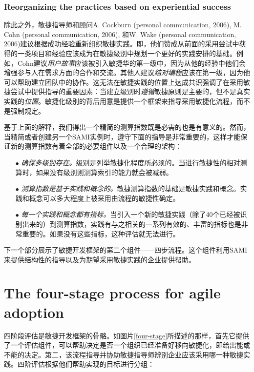 \documentclass[twocolumn]{svjour3}[]
\begin{document}
\subsubsection{Reorganizing the practices based on experiential success}

除此之外，敏捷指导师和顾问A. Cockburn (personal communication, 2006), M. Cohn (personal communication, 2006), 和W. Wake (personal communication, 2006)建议根据成功经验重新组织敏捷实践。即，他们赞成从前面的采用尝试中获得的一类项目和经验应该成为在敏捷级别中规划一个更好的实践安排的基础。例如，Cohn建议\textit{用户故事}应该被引入敏捷华的第一级中，因为从他的经验中他们会增强参与人在需求方面的合作和交流。其他人建议\textit{结对编程}应该在第一级，因为他可以帮助建立团队中的协作。这无法在敏捷实践的位置上达成共识强调了在采用敏捷尝试中提供指导的重要因素：当建立级别时\textit{遵循}敏捷原则是主要的，但不是真实实践的\textit{位置}。敏捷化级别的背后用意是提供一个框架来指导采用敏捷化流程，而不是强制规定。

基于上面的解释，我们得出一个精简的测算指数既是必需的也是有意义的。然而，当精简或者创建另一个SAMI实例时，遵守下面的指导是非常重要的，这样才能保证新的测算指数有着全部的必要组件以及一个合理的架构：

\begin{itemize}
    \item[$\bullet$] \textit{确保多级别存在。}级别是列举敏捷化程度所必须的。当进行敏捷性的相对测算时，如果没有级别则测算索引的能力就会被减弱。
    \item[$\bullet$] \textit{测算指数是基于实践和概念的。}敏捷测算指数的基础是敏捷实践和概念。实践和概念可以多大程度上被采用由流程的敏捷性确定。
    \item[$\bullet$] \textit{每一个实践和概念都有指标。}当引入一个新的敏捷实践（除了40个已经被识别出来的）到测算指数，实践有与之相关的一系列有效的、丰富的指标也是非常重要的。如果没有这些指标，这种评估就无法进行。
\end{itemize}

下一个部分展示了敏捷开发框架的第二个组件——四步流程。这个组件利用SAMI来提供结构性的指导以及为期望采用敏捷实践的企业提供帮助。

\section{The four-stage process for agile adoption}
\label{section:3}

四阶段评估是敏捷开发框架的骨骼。如图片\ref{four-stage}所描述的那样，首先它提供了一个评估组件，可以帮助决定是否一个组织已经准备好移向敏捷化，即给出能或不能的决定。第二，该流程指导并协助敏捷指导师辨别企业应该采用哪一种敏捷实践。四阶评估根据他们帮助实现的目标进行分组：
\end{document}

